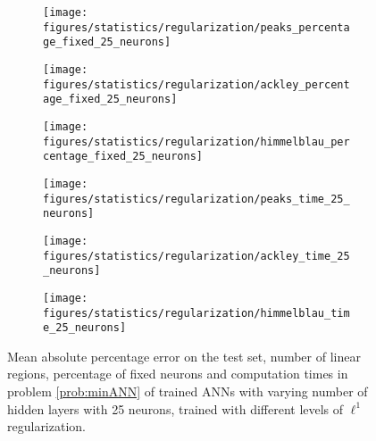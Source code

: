 \begin{appendices}
\begin{figure}[h]
    \begin{subfigure}{.32\linewidth}
        \texttt{[image: figures/statistics/regularization/peaks\_percentage\_fixed\_25\_neurons]}
    \end{subfigure}
    \begin{subfigure}{.32\linewidth}
        \texttt{[image: figures/statistics/regularization/ackley\_percentage\_fixed\_25\_neurons]}
    \end{subfigure}
    \begin{subfigure}{.32\linewidth}
        \texttt{[image: figures/statistics/regularization/himmelblau\_percentage\_fixed\_25\_neurons]}
    \end{subfigure}


    \begin{subfigure}{.32\linewidth}
        \texttt{[image: figures/statistics/regularization/peaks\_time\_25\_neurons]}
    \end{subfigure}
    \begin{subfigure}{.32\linewidth}
        \texttt{[image: figures/statistics/regularization/ackley\_time\_25\_neurons]}
    \end{subfigure}
    \begin{subfigure}{.32\linewidth}
        \texttt{[image: figures/statistics/regularization/himmelblau\_time\_25\_neurons]}
    \end{subfigure}

    \begin{subfigure}{\linewidth}
        \centering
        
    \end{subfigure}
    \caption{Mean absolute percentage error on the test set, number of linear regions, percentage of fixed neurons and computation times in problem \eqref{prob:minANN} of trained ANNs with varying number of hidden layers with 25 neurons, trained with different levels of $\ell^1$ regularization.}
    \label{fig:model_statistics_smaller_models}
\end{figure}

\end{appendices}